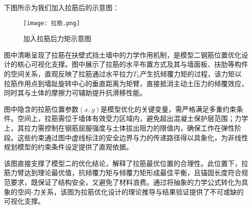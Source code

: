 \documentclass[withoutpreface,bwprint]{cumcmthesis}
\begin{document}
下图所示为我们加入拉筋后的示意图：
    \begin{figure}[H]
        \centering
        \texttt{[image: 拉筋.png]}
        \caption{加入拉筋后力矩示意图}
        \label{fig:加入拉筋后力矩示意图}
    \end{figure}

图中清晰呈现了拉筋在扶壁式挡土墙中的力学作用机制，是模型二钢筋位置优化设计的核心可视化支撑。图中展示了拉筋的水平布置方式及其与墙面板、扶肋等构件的空间关系，直观反映了拉筋通过水平拉力\(T_h\)产生抗倾覆力矩的过程，该力矩以拉筋作用点到墙趾旋转中心的垂直距离为矩臂，直接抵消主动土压力的倾覆效应，同时其与土体的摩擦力可辅助提升抗滑移性能。
\par
图中隐含的拉筋位置参数\((x,y)\)是模型优化的关键变量，需严格满足多重约束条件。空间上，拉筋需位于墙体有效受力区域内，避免超出混凝土保护层范围；力学上，其拉力需控制在钢筋屈服强度与土体拔出阻力的限值内，确保工作在弹性阶段。这些约束通过图中虚线标注的安全边界与力的传递路径得以具象化，为非线性规划模型的约束条件设定提供了直观依据。
\par
该图直接支撑了模型二的优化结论，解释了拉筋最优位置的合理性。此位置下，拉筋力臂达到理论最优值，抗倾覆力矩与倾覆力矩形成最佳平衡，且锚固长度符合规范要求，既保证了结构安全，又避免了材料浪费。通过将抽象的力学公式转化为具象的空间-力关系，该图为拉筋优化设计的理论推导与结果验证提供了不可或缺的可视化支撑。
\end{document}
